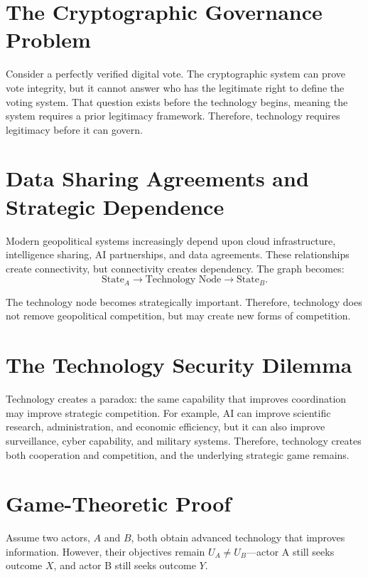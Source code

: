 \documentclass[11pt,openany]{book}
\theoremstyle{plain}
\theoremstyle{definition}
\begin{document}
\section*{The Cryptographic Governance Problem}

Consider a perfectly verified digital vote. The cryptographic system can prove vote integrity, but it cannot answer who has the legitimate right to define the voting system. That question exists before the technology begins, meaning the system requires a prior legitimacy framework. Therefore, technology requires legitimacy before it can govern.

\section*{Data Sharing Agreements and Strategic Dependence}

Modern geopolitical systems increasingly depend upon cloud infrastructure, intelligence sharing, AI partnerships, and data agreements. These relationships create connectivity, but connectivity creates dependency. The graph becomes:
\[
\text{State}_A \longrightarrow \text{Technology Node} \longrightarrow \text{State}_B.
\]

The technology node becomes strategically important. Therefore, technology does not remove geopolitical competition, but may create new forms of competition.

\section*{The Technology Security Dilemma}

Technology creates a paradox: the same capability that improves coordination may improve strategic competition. For example, AI can improve scientific research, administration, and economic efficiency, but it can also improve surveillance, cyber capability, and military systems. Therefore, technology creates both cooperation and competition, and the underlying strategic game remains.

\section*{Game-Theoretic Proof}

Assume two actors, \(A\) and \(B\), both obtain advanced technology that improves information. However, their objectives remain \(U_A \neq U_B\)—actor A still seeks outcome \(X\), and actor B still seeks outcome \(Y\). 
\end{document}
